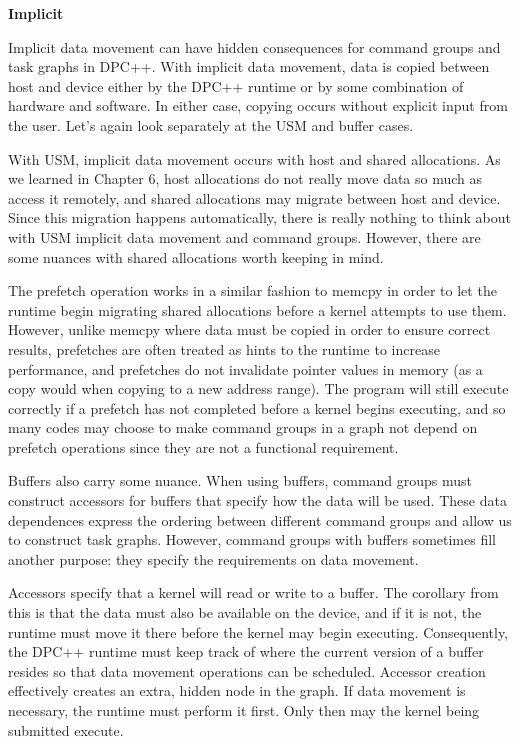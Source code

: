 \hspace*{\fill} \par %
\textbf{Implicit}

Implicit data movement can have hidden consequences for command groups and task graphs in DPC++. With implicit data movement, data is copied between host and device either by the DPC++ runtime or by some combination of hardware and software. In either case, copying occurs without explicit input from the user. Let’s again look separately at the USM and buffer cases.\par

With USM, implicit data movement occurs with host and shared allocations. As we learned in Chapter 6, host allocations do not really move data so much as access it remotely, and shared allocations may migrate between host and device. Since this migration happens automatically, there is really nothing to think about with USM implicit data movement and command groups. However, there are some nuances with shared allocations worth keeping in mind.\par

The prefetch operation works in a similar fashion to memcpy in order to let the runtime begin migrating shared allocations before a kernel attempts to use them. However, unlike memcpy where data must be copied in order to ensure correct results, prefetches are often treated as hints to the runtime to increase performance, and prefetches do not invalidate pointer values in memory (as a copy would when copying to a new address range). The program will still execute correctly if a prefetch has not completed before a kernel begins executing, and so many codes may choose to make command groups in a graph not depend on prefetch operations since they are not a functional requirement.\par

Buffers also carry some nuance. When using buffers, command groups must construct accessors for buffers that specify how the data will be used. These data dependences express the ordering between different command groups and allow us to construct task graphs. However, command groups with buffers sometimes fill another purpose: they specify the requirements on data movement.\par

Accessors specify that a kernel will read or write to a buffer. The corollary from this is that the data must also be available on the device, and if it is not, the runtime must move it there before the kernel may begin executing. Consequently, the DPC++ runtime must keep track of where the current version of a buffer resides so that data movement operations can be scheduled. Accessor creation effectively creates an extra, hidden node in the graph. If data movement is necessary, the runtime must perform it first. Only then may the kernel being submitted execute.\par

